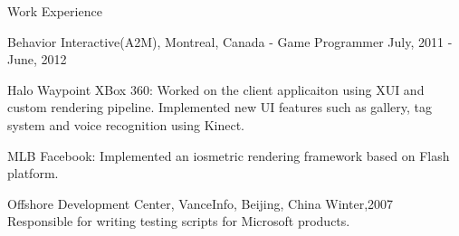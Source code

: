 \documentclass[10pt]{article}
\newenvironment{mydescription}{%
    \begin{description}
        \setlength{\itemsep}{0.25em}%
        \setlength{\parsep}{0em}%
        \setlength{\topsep}{\itemsep}%
        \setlength{\parskip}{0em}%
        \setlength{\labelwidth}{0.1em}
        \setlength{\labelsep}{0em} 
    }%
{\end{description}}
\begin{document}
\begin{cv}
\begin{cvlist}{Work Experience}
\item 
    \begin{mydescription}
		\item[Behavior Interactive(A2M), Montreal, Canada - Game Programmer]  \hfill July, 2011 - June, 2012 
			\begin{mydescription}
			\item[Halo Waypoint XBox 360: ] {Worked on the client applicaiton using XUI and custom rendering pipeline. Implemented new UI features such as gallery, tag system and voice recognition using Kinect. }
			\item[MLB Facebook: ] {Implemented an iosmetric rendering framework based on Flash platform. }
			\end{mydescription}
        	\item[Offshore Development Center, VanceInfo, Beijing, China] \hfill Winter,2007 \\ 
            Responsible for writing testing scripts for Microsoft products. 
    \end{mydescription}
\end{cvlist}



\end{cv}
\end{document}
